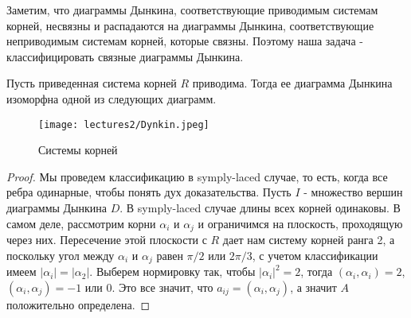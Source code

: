 \documentclass[a4article]{article}
\begin{document}
Заметим, что диаграммы Дынкина, соответствующие приводимым системам корней, несвязны и распадаются на диаграммы Дынкина, соответствующие неприводимым системам корней, которые связны. Поэтому наша задача - классифицировать связные диаграммы Дынкина.
\begin{theorem}
    Пусть приведенная система корней $R$ приводима. Тогда ее диаграмма Дынкина изоморфна одной из следующих диаграмм.
    \begin{figure}[h!]
    \centering
    \texttt{[image: lectures2/Dynkin.jpeg]}
    \caption{Системы корней}
    \label{fig:enter-label}
    \end{figure}
\end{theorem}
\begin{proof}
    Мы проведем классификацию в symply-laced случае, то есть, когда все ребра одинарные, чтобы понять дух доказательства. Пусть $I$ - множество вершин диаграммы Дынкина $D$. В 
    symply-laced случае длины всех корней одинаковы. В самом деле, рассмотрим корни $\alpha_i$ и $\alpha_j$ и ограничимся на плоскость, проходящую через них. Пересечение этой плоскости с $R$ дает нам систему корней ранга 2, а поскольку угол между $\alpha_i$ и $\alpha_j$ равен $\pi/2$ или $2\pi/3$, с учетом классификации имеем $|\alpha_i| = |\alpha_2|$. Выберем нормировку так, чтобы $|\alpha_i|^2=2$, тогда $(\alpha_i, \alpha_i) = 2$, $(\alpha_i, \alpha_j) = -1$ или $0$.
    Это все значит, что $a_{ij} = (\alpha_i, \alpha_j)$, а значит $A$ положительно определена. 


\end{proof}
\end{document}
